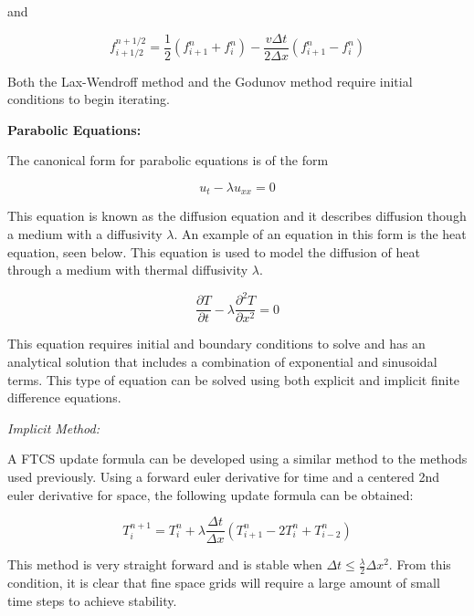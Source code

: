 \documentclass{article}
\begin{document}
      and
      
      \begin{equation}
      f^{n+1/2}_{i+1/2} = \frac{1}{2} \left(f^{n}_{i+1} + f^{n}_{i}\right) - \frac{v\Delta t}{2\Delta x}\left(f^{n}_{i+1} - f^{n}_{i}\right)
      \end{equation}    
      
      Both the Lax-Wendroff method and the Godunov method require initial conditions to begin iterating.
      
      \pagebreak
      
      \textbf{Parabolic Equations:}
      
      The canonical form for parabolic equations is of the form
      
      \begin{equation}
      u_{t} - \lambda u_{xx} = 0 
      \end{equation}
      
      This equation is known as the diffusion equation and  it describes diffusion though a medium with a diffusivity $\lambda$. An example of an equation in this form is the heat equation, seen below. This equation is used to model the diffusion of heat through a medium with thermal diffusivity $\lambda$. 
      
      \begin{equation}
      \frac{\partial T}{\partial t} - \lambda\frac{\partial^2 T}{\partial x^2} = 0
      \end{equation} 
       
      This equation requires initial and boundary conditions to solve and has an analytical solution that includes a combination of exponential and sinusoidal terms. This type of equation can be solved using both explicit and implicit finite difference equations.
      \bigskip
      
      \textit{Implicit Method:}
      
      A FTCS update formula can be developed using a similar method to the methods used previously. Using a forward euler derivative for time and a centered 2nd euler derivative for space, the following update formula can be obtained:
      
      \begin{equation}
      T_{i}^{n+1} = T_{i}^{n} + \lambda\frac{\Delta t}{\Delta x}\left(T_{i+1}^{n} - 2T_{i}^{n} + T_{i-2}^{n}\right)
      \end{equation}
      
      This method is very straight forward and is stable when $\Delta t \le \frac{\lambda}{2}\Delta x^2$. From this condition, it is clear that fine space grids will require a large amount of small time steps to achieve stability. 
      \bigskip
      
\end{document}
